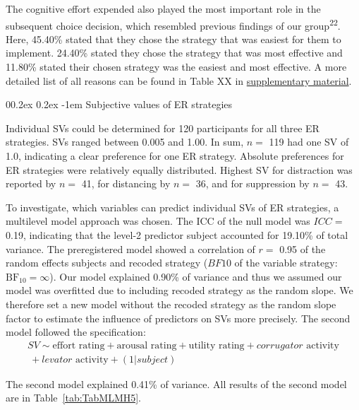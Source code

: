 \documentclass[
  man,floatsintext]{apa6}
\makeatletter
\let\oldparagraph\paragraph
\renewcommand{\paragraph}[1]{\oldparagraph{#1}\mbox{}}
\renewcommand{\paragraph}{\@startsection{paragraph}{4}{\parindent}%
  {0\baselineskip \@plus 0.2ex \@minus 0.2ex}%
  {-1em}%
  {\normalfont\normalsize\bfseries\itshape\typesectitle}}
\makeatother
\begin{document}
The cognitive effort expended also played the most important role in the subsequent choice decision, which resembled previous findings of our group\textsuperscript{22}.
Here, 45.40\% stated that they chose the strategy that was easiest for them to implement.
24.40\% stated they chose the strategy that was most effective and 11.80\% stated their chosen strategy was the easiest and most effective.
A more detailed list of all reasons can be found in Table XX in \protect\hyperlink{SupplementReasonChoice}{supplementary material}.

\hypertarget{subjective-values-of-er-strategies}{%
\paragraph{Subjective values of ER strategies}\label{subjective-values-of-er-strategies}}

Individual SVs could be determined for 120 participants for all three ER strategies.
SVs ranged between 0.005 and 1.00.
In sum, \(n=\) 119 had one SV of 1.0, indicating a clear preference for one ER strategy.
Absolute preferences for ER strategies were relatively equally distributed.
Highest SV for distraction was reported by \(n=\) 41, for distancing by \(n=\) 36, and for suppression by \(n=\) 43.

To investigate, which variables can predict individual SVs of ER strategies, a multilevel model approach was chosen.
The ICC of the null model was \(ICC=\) 0.19, indicating that the level-2 predictor subject accounted for 19.10\% of total variance.
The preregistered model showed a correlation of \(r=\) 0.95 of the random effects subjects and recoded strategy (\(BF10\) of the variable strategy: \(\mathrm{BF}_{\textrm{10}} = \infty\)).
Our model explained 0.90\% of variance and thus we assumed our model was overfitted due to including recoded strategy as the random slope.
We therefore set a new model without the recoded strategy as the random slope factor to estimate the influence of predictors on SVs more precisely.
The second model followed the specification:
\[
\begin{split}
SV \sim \text{effort rating} + \text{arousal rating} + \text{utility rating} + corrugator \text{ activity} \\\ + levator \text{ activity} + (1 |subject)
\end{split}
\]

The second model explained 0.41\% of variance.
All results of the second model are in Table~\ref{tab:TabMLMH5}.
\end{document}
